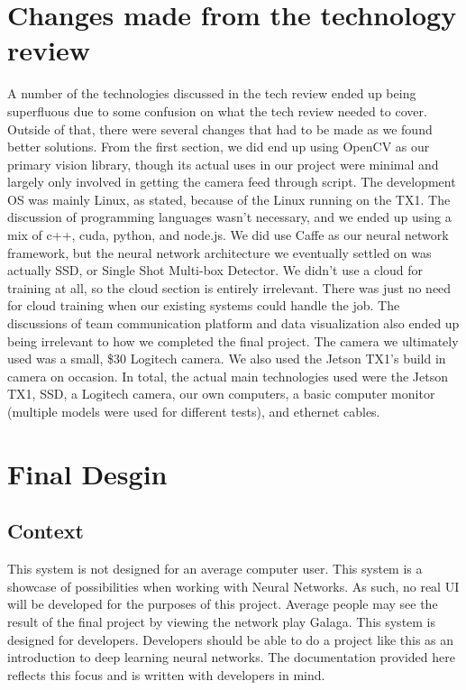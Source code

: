 \documentclass[onecolumn, draftclsnofoot,10pt, compsoc]{IEEEtran}
\begin{document}

%

\section{Changes made from the technology review}
A number of the technologies discussed in the tech review ended up being superfluous due to some confusion on what the tech review needed to cover.
Outside of that, there were several changes that had to be made as we found better solutions. 
From the first section, we did end up using OpenCV as our primary vision library, though its actual uses in our project were minimal and largely only involved in getting the camera feed through script.
The development OS was mainly Linux, as stated, because of the Linux running on the TX1.
The discussion of programming languages wasn't necessary, and we ended up using a mix of c++, cuda, python, and node.js.
We did use Caffe as our neural network framework,  but the neural network architecture we eventually settled on was actually SSD, or Single Shot Multi-box Detector.
We didn't use a cloud for training at all, so the cloud section is entirely irrelevant.
There was just no need for cloud training when our existing systems could handle the job.
The discussions of team communication platform and data visualization also ended up being irrelevant to how we completed the final project. 
The camera we ultimately used was a small, \$30 Logitech camera. 
We also used the Jetson TX1's build in camera on occasion. 
In total, the actual main technologies used were the Jetson TX1, SSD, a Logitech camera, our own computers, a basic computer monitor (multiple models were used for different tests), and ethernet cables.

\section{Final Desgin}
\subsection{Context}

This system is not designed for an average computer user.
This system is a showcase of possibilities when working with Neural Networks.
As such, no real UI will be developed for the purposes of this project.
Average people may see the result of the final project by viewing the network play Galaga.
\newline
\newline
This system is designed for developers.
Developers should be able to do a project like this as an introduction to deep learning neural networks.
The documentation provided here reflects this focus and is written with developers in mind.
\end{document}
